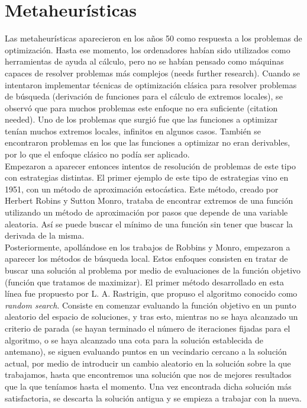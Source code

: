 \documentclass[12pt]{article} \usepackage[utf8x]{inputenc}
\begin{document}
\section{Metaheurísticas}

Las metaheurísticas aparecieron en los años 50 como respuesta a los
problemas de optimización. Hasta ese momento, los ordenadores habían
sido utilizados como herramientas de ayuda al cálculo, pero no se
habían pensado como máquinas capaces de resolver problemas más
complejos (needs further research). Cuando se intentaron implementar
técnicas de optimización clásica para resolver problemas de búsqueda
(derivación de funciones para el cálculo de extremos locales), se
observó que para muchos problemas este enfoque no era suficiente
(citation needed). Uno de los problemas que surgió fue que las
funciones a optimizar tenían muchos extremos locales, infinitos en
algunos casos. También se encontraron problemas en los que las
funciones a optimizar no eran derivables, por lo que el enfoque
clásico no podía
ser aplicado.\\

Empezaron a aparecer entonces intentos de resolución de problemas de
este tipo con estrategias distintas. El primer ejemplo de este tipo de
estrategias vino en 1951, con un método de aproximación estocástica.
Este método, creado por Herbert Robins y Sutton Monro, trataba de
encontrar extremos de una función utilizando un método de aproximación
por pasos que depende de una variable aleatoria. Así se puede buscar
el mínimo de una función sin tener que buscar la derivada de la misma.\\

Posteriormente, apollándose en los trabajos de Robbins y Monro,
empezaron a aparecer los métodos de búsqueda local. Estos enfoques
consisten en tratar de buscar una solución al problema por medio de
evaluaciones de la función objetivo (función que tratamos de
maximizar). El primer método desarrollado en esta línea fue propuesto
por L. A. Rastrigin, que propuso el algoritmo conocido como
\textit{random search}. Consiste en comenzar evaluando la función
objetivo en un punto aleatorio del espacio de soluciones, y tras esto,
mientras no se haya alcanzado un criterio de parada (se hayan
terminado el número de iteraciones fijadas para el algoritmo, o se
haya alcanzado una cota para la solución establecida de antemano), se
siguen evaluando puntos en un vecindario cercano a la solución actual,
por medio de introducir un cambio aleatorio en la solución sobre la
que trabajamos, hasta que encontremos una solución que nos de mejores
resultados que la que teníamos hasta el momento. Una vez encontrada
dicha solución más satisfactoria, se descarta la solución antigua
y se empieza a trabajar con la nueva.\\
\end{document}
